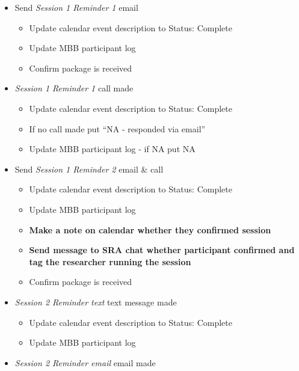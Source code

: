 \documentclass[]{book}
\providecommand{\tightlist}{%
  \setlength{\itemsep}{0pt}\setlength{\parskip}{0pt}}
\begin{document}
\begin{itemize}
\tightlist
\item
  Send \emph{Session 1 Reminder 1} email

  \begin{itemize}
  \tightlist
  \item
    Update calendar event description to Status: Complete
  \item
    Update MBB participant log\\
  \item
    Confirm package is received
  \end{itemize}
\item
  \emph{Session 1 Reminder 1} call made

  \begin{itemize}
  \tightlist
  \item
    Update calendar event description to Status: Complete\\
  \item
    If no call made put ``NA - responded via email''
  \item
    Update MBB participant log - if NA put NA\\
  \end{itemize}
\item
  Send \emph{Session 1 Reminder 2} email \& call

  \begin{itemize}
  \tightlist
  \item
    Update calendar event description to Status: Complete
  \item
    Update MBB participant log
  \item
    \textbf{Make a note on calendar whether they confirmed session}
  \item
    \textbf{Send message to SRA chat whether participant confirmed and tag the researcher running the session}
  \item
    Confirm package is received
  \end{itemize}
\item
  \emph{Session 2 Reminder text} text message made

  \begin{itemize}
  \tightlist
  \item
    Update calendar event description to Status: Complete
  \item
    Update MBB participant log
  \end{itemize}
\item
  \emph{Session 2 Reminder email} email made


\end{itemize}
\end{document}
